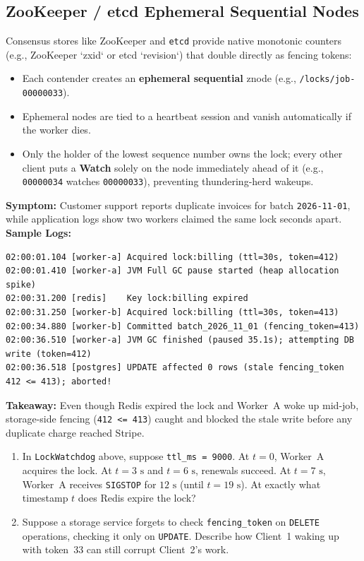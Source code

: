 \subsection{ZooKeeper / etcd Ephemeral Sequential Nodes}
Consensus stores like ZooKeeper and \texttt{etcd} provide native monotonic counters (e.g., ZooKeeper `zxid` or etcd `revision`) that double directly as fencing tokens:
\begin{itemize}[leftmargin=18pt]
  \item Each contender creates an \textbf{ephemeral sequential} znode (e.g., \texttt{/locks/job-00000033}).
  \item Ephemeral nodes are tied to a heartbeat session and vanish automatically if the worker dies.
  \item Only the holder of the lowest sequence number owns the lock; every other client puts a \textbf{Watch} solely on the node immediately ahead of it (e.g., \texttt{00000034} watches \texttt{00000033}), preventing thundering-herd wakeups.
\end{itemize}

\begin{realworldbox}
\textbf{Symptom:} Customer support reports duplicate invoices for batch \texttt{2026-11-01}, while application logs show two workers claimed the same lock seconds apart.\\
\textbf{Sample Logs:}
\begin{verbatim}
02:00:01.104 [worker-a] Acquired lock:billing (ttl=30s, token=412)
02:00:01.410 [worker-a] JVM Full GC pause started (heap allocation spike)
02:00:31.200 [redis]    Key lock:billing expired
02:00:31.250 [worker-b] Acquired lock:billing (ttl=30s, token=413)
02:00:34.880 [worker-b] Committed batch_2026_11_01 (fencing_token=413)
02:00:36.510 [worker-a] JVM GC finished (paused 35.1s); attempting DB write (token=412)
02:00:36.518 [postgres] UPDATE affected 0 rows (stale fencing_token 412 <= 413); aborted!
\end{verbatim}
\textbf{Takeaway:} Even though Redis expired the lock and Worker~A woke up mid-job, storage-side fencing (\texttt{412 <= 413}) caught and blocked the stale write before any duplicate charge reached Stripe.
\end{realworldbox}

\begin{tryityourselfbox}
\begin{enumerate}[leftmargin=18pt]
  \item In \texttt{LockWatchdog} above, suppose \texttt{ttl\_ms = 9000}. At $t=0$, Worker~A acquires the lock. At $t=3\text{ s}$ and $t=6\text{ s}$, renewals succeed. At $t=7\text{ s}$, Worker~A receives \texttt{SIGSTOP} for $12\text{ s}$ (until $t=19\text{ s}$). At exactly what timestamp $t$ does Redis expire the lock?
  \item Suppose a storage service forgets to check \texttt{fencing\_token} on \texttt{DELETE} operations, checking it only on \texttt{UPDATE}. Describe how Client~1 waking up with token~33 can still corrupt Client~2's work.
\end{enumerate}
\end{tryityourselfbox}

